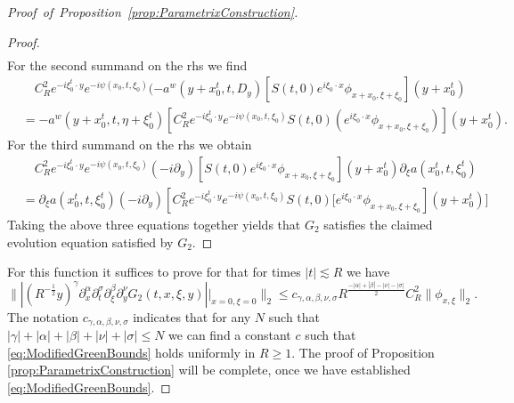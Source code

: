 \documentclass{amsart}
\theoremstyle{definition}
\begin{document}
\begin{proof}[Proof~of~Proposition~\ref{prop:ParametrixConstruction}]
\begin{proof}
\begin{equation}
\begin{split}
        \end{split}
    \end{equation}
    For the second summand on the rhs we find
    \begin{equation}
        \label{eq:ModGreenII}
        \begin{split}
        &\quad C_R^2 e^{-i \xi_0^t \cdot y} e^{-i \psi(x_0,t,\xi_0)} (-a^w(y+x_0^t,t,D_y)[S(t,0) e^{i \xi_0 \cdot x} \phi_{x+x_0,\xi+\xi_0}](y+x_0^t) \\
        &= - a^w(y+x_0^t,t,\eta+\xi_0^t)[ C_R^2 e^{-i \xi_0^t \cdot y} e^{-i \psi(x_0,t,\xi_0)} S(t,0) (e^{i \xi_0 \cdot x} \phi_{x+x_0,\xi+\xi_0})](y+x_0^t).
        \end{split}
    \end{equation}
    For the third summand on the rhs we obtain
    \begin{equation}
        \label{eq:ModGreenIII}
        \begin{split}
            &\quad C_R^2 e^{-i \xi_0^t \cdot y} e^{-i \psi(x_0,t,\xi_0)} (-i \partial_y) [S(t,0) e^{i \xi_0 \cdot x} \phi_{x+x_0,\xi+\xi_0}](y+x_0^t) \partial_{\xi} a(x_0^t,t,\xi_0^t) \\
            &= \partial_{\xi} a(x_0^t,t,\xi_0^t) (-i \partial_y) [C_R^2 e^{-i \xi_0^t \cdot y} e^{-i \psi(x_0,t,\xi_0)} S(t,0) \big[ e^{i \xi_0 \cdot x} \phi_{x+x_0,\xi+\xi_0}](y+x_0^t)]
        \end{split}
    \end{equation}
    Taking the above three equations together yields that $G_2$ satisfies the claimed evolution equation satisfied by $G_2$.
\end{proof}



For this function it suffices to prove for that for times $|t| \lesssim R$ we have
\begin{equation}
\label{eq:ModifiedGreenBounds}
\| | (R^{-\frac{1}{2}} y)^{\gamma} \partial_x^{\alpha} \partial_t^{\sigma} \partial_{\xi}^{\beta} \partial_y^{\nu} G_2(t,x,\xi,y)| \big|_{x=0,\xi = 0} \|_2 \leq c_{\gamma,\alpha,\beta,\nu,\sigma} R^{\frac{-|\alpha| + |\beta| - |\nu| - |\sigma|}{2}} C_R^2 \| \phi_{x,\xi} \|_2. 
\end{equation}
The notation $c_{\gamma,\alpha,\beta,\nu,\sigma}$ indicates that for any $N$ such that $|\gamma|+|\alpha|+|\beta|+|\nu|+|\sigma| \leq N$ we can find a constant $c$ such that \eqref{eq:ModifiedGreenBounds} holds uniformly in $R \geq 1$. 
The proof of Proposition \ref{prop:ParametrixConstruction} will be complete, once we have established \eqref{eq:ModifiedGreenBounds}.
\end{proof}
\end{document}

